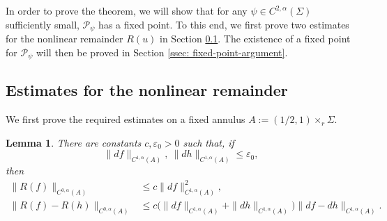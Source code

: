 \documentclass[11pt]{amsart}
\newtheorem{lemma}{Lemma}
\theoremstyle{definition}
\theoremstyle{remark}
\begin{document}
In order to prove the theorem, we will show that for any $\psi\in C^{2,\alpha}(\Sigma)$ sufficiently small, $\mathcal{P}_\psi$ has a fixed point.
To this end, we first prove two estimates for the nonlinear remainder $R(u)$ in Section \ref{ssec: est-Rf}.
The existence of a fixed point for $\mathcal{P}_\psi$ will then be proved in Section \ref{ssec: fixed-point-argument}.

\subsection{Estimates for the nonlinear remainder}\label{ssec: est-Rf}

We first prove the required estimates on a fixed annulus $A := (1/2,1) \times_r \Sigma$.

\begin{lemma}\label{lem:fixed-annulus-R}
There are constants \(c,\varepsilon_0>0\) such that, if
\[
    \|df\|_{C^{1,\alpha}(A)},\ \|dh\|_{C^{1,\alpha}(A)}
    \le \varepsilon_0,
\]
then
\begin{align}
    \|R(f)\|_{C^{0,\alpha}(A)}
    &\le
    c\|df\|_{C^{1,\alpha}(A)}^2, \label{eq:fixed-annulus-R-quadratic}\\
    \|R(f)-R(h)\|_{C^{0,\alpha}(A)}
    &\le
    c\bigl(
        \|df\|_{C^{1,\alpha}(A)}
        +
        \|dh\|_{C^{1,\alpha}(A)}
    \bigr)
    \|df-dh\|_{C^{1,\alpha}(A)}. \label{eq:fixed-annulus-R-lipschitz}
\end{align}
\end{lemma}
\end{document}
